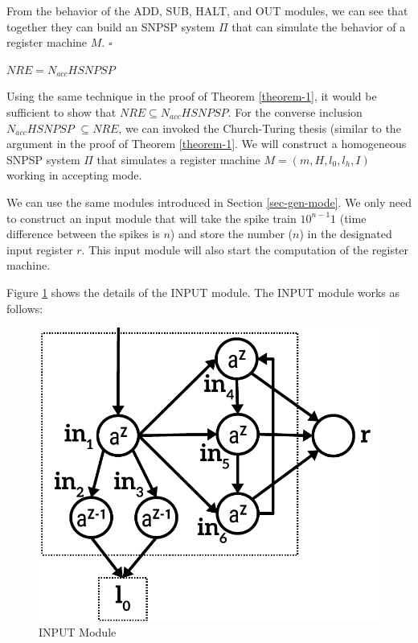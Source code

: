 \documentclass[smallextended]{svjour3}
\begin{document}

From the behavior of the ADD, SUB, HALT, and OUT modules, we can see that together they can build an SNPSP system $\Pi$ that can simulate the
behavior of a register machine $M.$ $\square$ 


\begin{theorem} \label{theorem-2}
$NRE = N_{acc}HSNPSP$ 
\end{theorem}
  
\proof Using the same technique in the proof of Theorem \ref{theorem-1}, it would be sufficient to show that $NRE \subseteq N_{acc}HSNPSP$. For the
converse inclusion $N_{acc}HSNPSP$ $\subseteq NRE$, we can invoked the Church-Turing thesis (similar to the argument in the proof of Theorem 
\ref{theorem-1}. We will construct a homogeneous SNPSP system $\Pi$ that simulates a register machine $M=(m, H, l_0, l_h, I)$ working in accepting mode.

We can use the same modules introduced in Section \ref{sec-gen-mode}. We only need to construct an input module that will take the spike train
$10^{n-1}1$ (time difference between the spikes is $n$) and store the number ($n$) in the designated input register $r$. This input module will
also start the computation of the register machine.

Figure \ref{fig-input} shows the details of the INPUT module. The INPUT module works as follows:

\begin{figure}
\begin{center}
\includegraphics[scale=0.50]{Fig4.pdf}
\caption{INPUT Module}
\label{fig-input}
\end{center}
\end{figure}   
\end{document}
